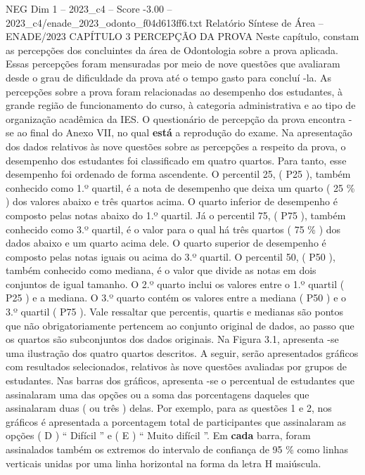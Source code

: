 \begin{textsample}{NEG Dim 1 – 2023\_c4 – Score -3.00 – 2023\_c4/enade\_2023\_odonto\_f04d613ff6.txt}  \label{ex:f1_neg_241}
Relatório Síntese de Área – ENADE/2023 CAPÍTULO 3 PERCEPÇÃO DA PROVA Neste capítulo, constam as percepções dos concluintes da área de Odontologia sobre a prova aplicada.
Essas percepções foram mensuradas por meio de nove questões que avaliaram desde o grau de dificuldade da prova até o tempo gasto para concluí -la.
As percepções sobre a prova foram relacionadas ao desempenho dos estudantes, à grande região de funcionamento do curso, à categoria administrativa e ao tipo de organização acadêmica da IES.
O questionário de percepção da prova encontra -se ao final do Anexo VII, no qual \textbf{está} a reprodução do exame.
Na apresentação dos dados relativos às nove questões sobre as percepções a respeito da prova, o desempenho dos estudantes foi classificado em quatro quartos.
Para tanto, esse desempenho foi ordenado de forma ascendente.
O percentil 25, ( P25 ), também conhecido como 1.º quartil, é a nota de desempenho que deixa um quarto ( 25 \% ) dos valores abaixo e três quartos acima.
O quarto inferior de desempenho é composto pelas notas abaixo do 1.º quartil.
Já o percentil 75, ( P75 ), também conhecido como 3.º quartil, é o valor para o qual há três quartos ( 75 \% ) dos dados abaixo e um quarto acima dele.
O quarto superior de desempenho é composto pelas notas iguais ou acima do 3.º quartil.
O percentil 50, ( P50 ), também conhecido como mediana, é o valor que divide as notas em dois conjuntos de igual tamanho.
O 2.º quarto inclui os valores entre o 1.º quartil ( P25 ) e a mediana.
O 3.º quarto contém os valores entre a mediana ( P50 ) e o 3.º quartil ( P75 ).
Vale ressaltar que percentis, quartis e medianas são pontos que não obrigatoriamente pertencem ao conjunto original de dados, ao passo que os quartos são subconjuntos dos dados originais.
Na Figura 3.1, apresenta -se uma ilustração dos quatro quartos descritos.
A seguir, serão apresentados gráficos com resultados selecionados, relativos às nove questões avaliadas por grupos de estudantes.
Nas barras dos gráficos, apresenta -se o percentual de estudantes que assinalaram uma das opções ou a soma das porcentagens daqueles que assinalaram duas ( ou três ) delas.
Por exemplo, para as questões 1 e 2, nos gráficos é apresentada a porcentagem total de participantes que assinalaram as opções ( D ) “ Difícil ” e ( E ) “ Muito difícil ”.
Em \textbf{cada} barra, foram assinalados também os extremos do intervalo de confiança de 95 \% como linhas verticais unidas por uma linha horizontal na forma da letra H maiúscula.

\end{textsample}
